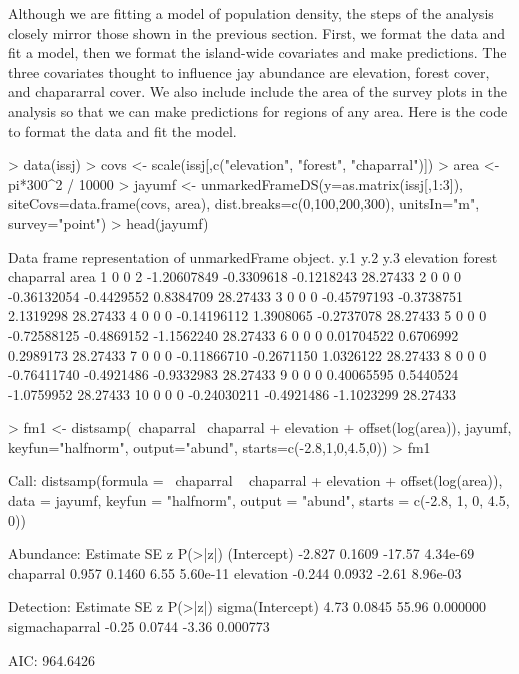 \documentclass[a4paper]{article}
\renewenvironment{Schunk}{\vspace{\topsep}}{\vspace{\topsep}}
\begin{document}
Although we are fitting a model of population density, the steps of
the analysis closely mirror those shown in the previous
section. First, we format the data and fit a model, then we format the
island-wide covariates and make predictions. The three covariates
thought to influence jay abundance are elevation, forest cover, and
chapararral cover. We also include include the area of the survey
plots in the analysis so that we can make predictions for regions of
any area. Here is the code to format the data and fit the model.

\begin{Schunk}
\begin{Sinput}
> data(issj)
> covs <- scale(issj[,c("elevation", "forest", "chaparral")])
> area <- pi*300^2 / 10000
> jayumf <- unmarkedFrameDS(y=as.matrix(issj[,1:3]),
                           siteCovs=data.frame(covs, area),
                           dist.breaks=c(0,100,200,300),
                           unitsIn="m", survey="point")
> head(jayumf)
\end{Sinput}
\begin{Soutput}
Data frame representation of unmarkedFrame object.
   y.1 y.2 y.3   elevation     forest  chaparral     area
1    0   0   2 -1.20607849 -0.3309618 -0.1218243 28.27433
2    0   0   0 -0.36132054 -0.4429552  0.8384709 28.27433
3    0   0   0 -0.45797193 -0.3738751  2.1319298 28.27433
4    0   0   0 -0.14196112  1.3908065 -0.2737078 28.27433
5    0   0   0 -0.72588125 -0.4869152 -1.1562240 28.27433
6    0   0   0  0.01704522  0.6706992  0.2989173 28.27433
7    0   0   0 -0.11866710 -0.2671150  1.0326122 28.27433
8    0   0   0 -0.76411740 -0.4921486 -0.9332983 28.27433
9    0   0   0  0.40065595  0.5440524 -1.0759952 28.27433
10   0   0   0 -0.24030211 -0.4921486 -1.1023299 28.27433
\end{Soutput}
\begin{Sinput}
> fm1 <- distsamp(~chaparral ~chaparral + elevation + offset(log(area)),
                 jayumf, keyfun="halfnorm", output="abund",
                 starts=c(-2.8,1,0,4.5,0))
> fm1
\end{Sinput}
\begin{Soutput}
Call:
distsamp(formula = ~chaparral ~ chaparral + elevation + offset(log(area)), 
    data = jayumf, keyfun = "halfnorm", output = "abund", starts = c(-2.8, 
        1, 0, 4.5, 0))

Abundance:
            Estimate     SE      z  P(>|z|)
(Intercept)   -2.827 0.1609 -17.57 4.34e-69
chaparral      0.957 0.1460   6.55 5.60e-11
elevation     -0.244 0.0932  -2.61 8.96e-03

Detection:
                 Estimate     SE     z  P(>|z|)
sigma(Intercept)     4.73 0.0845 55.96 0.000000
sigmachaparral      -0.25 0.0744 -3.36 0.000773

AIC: 964.6426 
\end{Soutput}
\end{Schunk}
\end{document}

